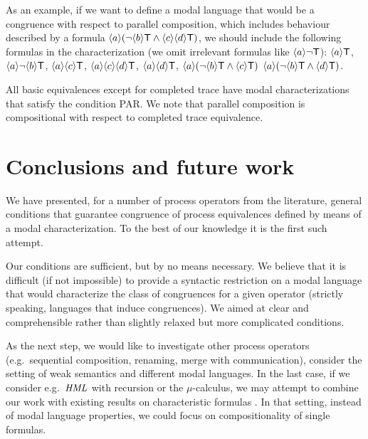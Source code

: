 \documentclass{eptcs}
\def\hml{{\it HML}}
\def\true{{\sf T}}
\newcommand{\diam}[1]{\langle#1\rangle}
\begin{document}
As an example, if we want to define a modal language that would be a congruence with respect to parallel composition, which includes behaviour described by a formula $\diam{a}(\neg \diam{b} \true \wedge \diam{c} \diam{d}\true)$, we should include the following formulas in the characterization (we omit irrelevant formulas like $\diam{a}\neg \true$): 
$\diam{a}\true$,
$\diam{a}\neg \diam{b} \true$,
$\diam{a}\diam{c} \true$,
$\diam{a}\diam{c} \diam{d} \true$,
$\diam{a}\diam{d} \true$,
$\diam{a}(\neg \diam{b} \true \wedge \diam{c}\true)$
$\diam{a}(\neg \diam{b} \true \wedge \diam{d}\true)$.

All basic equivalences except for completed trace have modal characterizations that satisfy the condition PAR. We note that parallel composition is compositional with respect to completed trace equivalence.

\section{Conclusions and future work}

We have presented, for a number of process operators from the literature, general conditions that guarantee congruence of process equivalences defined by means of a modal characterization. To the best of our knowledge it is the first such attempt.

Our conditions are sufficient, but by no means necessary. We believe that it is difficult (if not impossible) to provide a syntactic restriction on a modal language that would characterize the class of congruences for a given operator (strictly speaking, languages that induce congruences). We aimed at clear and comprehensible rather than slightly relaxed but more complicated conditions.

As the next step, we would like to investigate other process operators (e.g.\ sequential composition, renaming, merge with communication), consider the setting of weak semantics and different modal languages. In the last case, if we consider e.g.\ $\hml$ with recursion or the $\mu$-calculus, we may attempt to combine our work with existing results on characteristic formulas \cite{AcInSa09}. In that setting, instead of modal language properties, we could focus on compositionality of single formulas.
\end{document}
